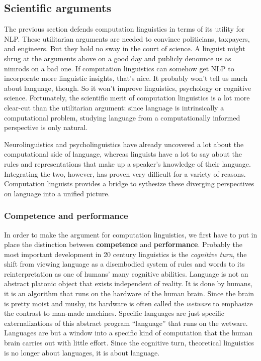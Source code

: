 \subsection{Scientific arguments}
\label{ssec:formal_arguments_science}

The previous section defends computation linguistics in terms of its utility for NLP\@. 
These utilitarian arguments are needed to convince politicians, taxpayers, and engineers.
But they hold no sway in the court of science.
A linguist might shrug at the arguments above on a good day and publicly denounce us as nimrods on a bad one.
If computation linguistics can somehow get NLP to incorporate more linguistic insights, that's nice.
It probably won't tell us much about language, though.
So it won't improve linguistics, psychology or cognitive science.
Fortunately, the scientific merit of computation linguistics is a lot more clear-cut than the utilitarian argument: since language is intrinsically a computational problem, studying language from a computationally informed perspective is only natural.

Neurolinguistics and psycholinguistics have already uncovered a lot about the computational side of language, whereas linguists have a lot to say about the rules and representations that make up a speaker's knowledge of their language.
Integrating the two, however, has proven very difficult for a variety of reasons.
Computation linguists provides a bridge to sythesize these diverging perspectives on language into a unified picture.


\subsubsection{Competence and performance}
\label{sub:formal_arguments_science_competence-performance}

In order to make the argument for computation linguistics, we first have to put in place the distinction between \textbf{competence} and \textbf{performance}.
Probably the most important development in 20 century linguistics is the \emph{cognitive turn}, the shift from viewing language as a disembodied system of rules and words to its reinterpretation as one of humans' many cognitive abilities.
Language is not an abstract platonic object that exists independent of reality.
It is done by humans, it is an algorithm that runs on the hardware of the human brain.
Since the brain is pretty moist and mushy, its hardware is often called the \emph{wetware} to emphasize the contrast to man-made machines.
Specific languages are just specific externalizations of this abstract program ``language'' that runs on the wetware.
Languages are but a window into a specific kind of computation that the human brain carries out with little effort.
Since the cognitive turn, theoretical linguistics is no longer about languages, it is about language.

